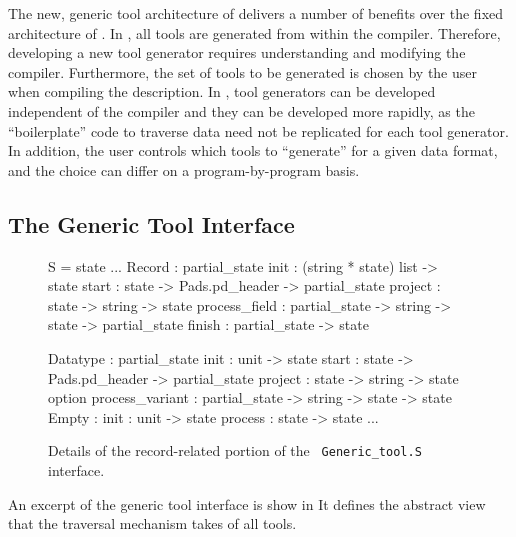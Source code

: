 The new, generic tool architecture of \padsml{} delivers a number of
benefits over the fixed architecture of \padsc{}. In \padsc{}, all
tools are generated from within the compiler. Therefore, developing a
new tool generator requires understanding and modifying the compiler.
Furthermore, the set of tools to be generated is chosen by the user
when compiling the description.  In \padsml{}, tool generators can be
developed independent of the compiler and they can be developed more
rapidly, as the ``boilerplate'' code to traverse data need not be
replicated for each tool generator. In addition, the user controls
which tools to ``generate'' for a given data format, and the choice
can differ on a program-by-program basis.

\subsection{The Generic Tool Interface}
\label{sec:gentool-interface}

\begin{figure}
\begin{code}\scriptsize
{}  S = 
   state
  ...
   Record : 
     partial_state
      init          : (string * state) list -> state
      start         : state -> Pads.pd_header 
                         -> partial_state
      project       : state -> string -> state
      process_field : partial_state -> string
                         -> state -> partial_state
      finish        : partial_state -> state

   Datatype : 
     partial_state
      init            : unit -> state
      start           : state -> Pads.pd_header 
                           -> partial_state
      project         : state -> string -> state option
      process_variant : partial_state -> string 
                           -> state -> state
     Empty : 
       init     : unit -> state
       process  : state -> state
   ...
\end{code}
\caption{Details of the record-related portion of the {\tt
    Generic\_tool.S} interface.}
\label{fig:gentool-interface}
\end{figure}

An excerpt of the generic tool interface is show in
 It defines the abstract view that the
traversal mechanism takes of all tools.

